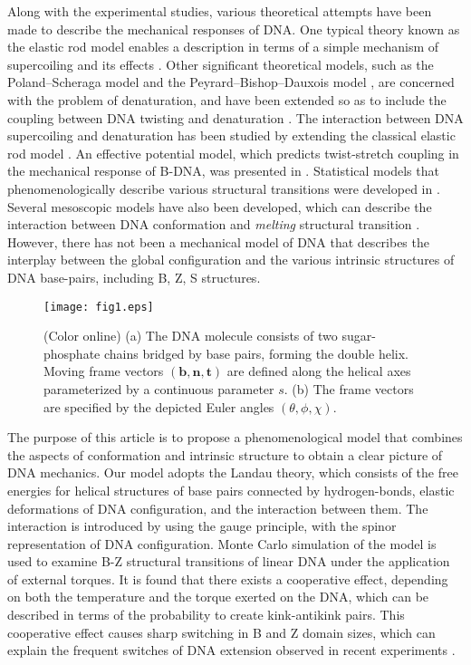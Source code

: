 \documentclass[pre,showpacs,twocolumn,superscriptaddress]{revtex4}
\begin{document}
Along with the experimental studies, various theoretical attempts have been made 
to describe the mechanical responses of DNA. 
One typical theory known as the elastic rod model enables a description in terms of 
a simple mechanism of supercoiling and its effects 
\cite{recentReviewMarko,MarkoSiggia,Strick,rodPlectoneme}. 
Other significant theoretical models, such as the Poland--Scheraga
model \cite{PS} and 
the Peyrard--Bishop--Dauxois model \cite{PB}, are concerned with the problem of 
denaturation, and have been extended so as to include the coupling between DNA twisting 
and denaturation \cite{cocco1999}.
The interaction between DNA supercoiling and denaturation has been studied by 
extending the classical elastic rod model \cite{supercoilDenaturation}.
An effective potential model, which predicts twist-stretch coupling in
the mechanical 
response of B-DNA, was presented in \cite{twistStretch}.
Statistical models that phenomenologically describe various structural transitions 
were developed in \cite{statModel}. 
Several mesoscopic models have also been developed, which can describe the interaction between DNA
conformation  and {\em melting} structural transition \cite{yan_marko,palmeri}.
However, 
there has not been a mechanical model of DNA that describes 
the interplay between the global configuration and the various intrinsic structures 
of DNA base-pairs, including B, Z, S structures.
\begin{figure}[t]
\texttt{[image: fig1.eps]}
\caption{(Color online) 
(a)	The DNA molecule consists of two sugar-phosphate chains bridged by base pairs, 
forming the double helix. Moving frame vectors $({\bm b,\bm n,\bm t})$ are defined 
along the helical axes parameterized by a continuous parameter $s$.
(b) The frame vectors are specified by the depicted Euler angles
 $ (\theta, \phi, \chi) $.
}
\label{manga}
\end{figure}





The purpose of this article is to propose a phenomenological model that combines 
the aspects of conformation and intrinsic structure to obtain a clear picture of DNA 
mechanics. 
Our model adopts the Landau theory, which consists of the free energies for helical 
structures of base pairs connected by hydrogen-bonds, elastic deformations of DNA 
configuration, and the interaction between them. 
The interaction is introduced by using the gauge principle,
with the 
spinor representation of DNA configuration.
Monte Carlo simulation of the model is used to examine B-Z structural transitions 
of linear DNA under the application of external torques. 
It is found that there exists a cooperative effect, depending on both the temperature 
and the torque exerted on the DNA, which can be described in terms of the probability 
to create kink-antikink pairs. This cooperative effect causes sharp switching in B 
and Z domain sizes, which can explain the frequent switches of DNA extension observed 
in recent experiments \cite{BZtrans}.
\end{document}
